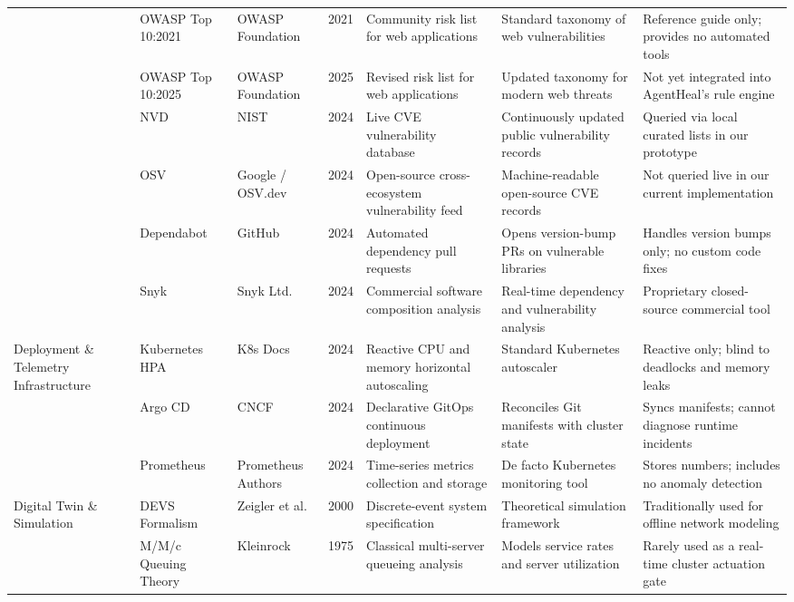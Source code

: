 \documentclass[10pt,conference]{IEEEtran}
\begin{document}
\begin{table}[!t]
\begin{tabular}{@{}p{1.6cm}p{1.8cm}p{1.8cm}p{0.5cm}p{3.0cm}p{3.2cm}p{3.5cm}@{}}
 & OWASP Top 10:2021 & OWASP Foundation \cite{owasp2021} & 2021 & Community risk list for web applications & Standard taxonomy of web vulnerabilities & Reference guide only; provides no automated tools \\
 & OWASP Top 10:2025 & OWASP Foundation \cite{owasp2025} & 2025 & Revised risk list for web applications & Updated taxonomy for modern web threats & Not yet integrated into AgentHeal's rule engine \\
 & NVD & NIST \cite{nvd} & 2024 & Live CVE vulnerability database & Continuously updated public vulnerability records & Queried via local curated lists in our prototype \\
 & OSV & Google / OSV.dev \cite{osv} & 2024 & Open-source cross-ecosystem vulnerability feed & Machine-readable open-source CVE records & Not queried live in our current implementation \\
 & Dependabot & GitHub \cite{dependabot} & 2024 & Automated dependency pull requests & Opens version-bump PRs on vulnerable libraries & Handles version bumps only; no custom code fixes \\
 & Snyk & Snyk Ltd. \cite{snyk} & 2024 & Commercial software composition analysis & Real-time dependency and vulnerability analysis & Proprietary closed-source commercial tool \\
\midrule
\multirow{3}{1.6cm}{Deployment \& Telemetry Infrastructure} & Kubernetes HPA & K8s Docs \cite{hpa} & 2024 & Reactive CPU and memory horizontal autoscaling & Standard Kubernetes autoscaler & Reactive only; blind to deadlocks and memory leaks \\
 & Argo CD & CNCF \cite{argocd} & 2024 & Declarative GitOps continuous deployment & Reconciles Git manifests with cluster state & Syncs manifests; cannot diagnose runtime incidents \\
 & Prometheus & Prometheus Authors \cite{prometheus} & 2024 & Time-series metrics collection and storage & De facto Kubernetes monitoring tool & Stores numbers; includes no anomaly detection \\
\midrule
\multirow{2}{1.6cm}{Digital Twin \& Simulation} & DEVS Formalism & Zeigler et al. \cite{dtsim} & 2000 & Discrete-event system specification & Theoretical simulation framework & Traditionally used for offline network modeling \\
 & M/M/c Queuing Theory & Kleinrock \cite{queueing} & 1975 & Classical multi-server queueing analysis & Models service rates and server utilization & Rarely used as a real-time cluster actuation gate \\
\bottomrule
\end{tabular}
\end{table}
\end{document}
